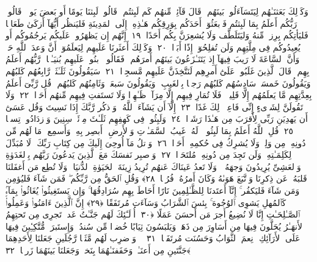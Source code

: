  وَكَذَٟلِكَ بَعَثنَـٰهُم لِيَتَسَآءَلُوا۟ بَينَهُم ۚ قَالَ قَآئِلٌۭ مِّنهُم كَم لَبِثتُم ۖ قَالُوا۟ لَبِثنَا يَومًا أَو بَعضَ يَومٍۢ ۚ قَالُوا۟ رَبُّكُم أَعلَمُ بِمَا لَبِثتُم فَٱبعَثُوٓا۟ أَحَدَكُم بِوَرِقِكُم هَـٰذِهِۦٓ إِلَى ٱلمَدِينَةِ فَليَنظُر أَيُّهَآ أَزكَىٰ طَعَامًۭا فَليَأتِكُم بِرِزقٍۢ مِّنهُ وَليَتَلَطَّف وَلَا يُشعِرَنَّ بِكُم أَحَدًا ﴿١٩﴾
 إِنَّهُم إِن يَظهَرُوا۟ عَلَيكُم يَرجُمُوكُم أَو يُعِيدُوكُم فِى مِلَّتِهِم وَلَن تُفلِحُوٓا۟ إِذًا أَبَدًۭا ﴿٢٠﴾
 وَكَذَٟلِكَ أَعثَرنَا عَلَيهِم لِيَعلَمُوٓا۟ أَنَّ وَعدَ ٱللَّهِ حَقٌّۭ وَأَنَّ ٱلسَّاعَةَ لَا رَيبَ فِيهَآ إِذ يَتَنَـٰزَعُونَ بَينَهُم أَمرَهُم ۖ فَقَالُوا۟ ٱبنُوا۟ عَلَيهِم بُنيَـٰنًۭا ۖ رَّبُّهُم أَعلَمُ بِهِم ۚ قَالَ ٱلَّذِينَ غَلَبُوا۟ عَلَىٰٓ أَمرِهِم لَنَتَّخِذَنَّ عَلَيهِم مَّسجِدًۭا ﴿٢١﴾
 سَيَقُولُونَ ثَلَـٰثَةٌۭ رَّابِعُهُم كَلبُهُم وَيَقُولُونَ خَمسَةٌۭ سَادِسُهُم كَلبُهُم رَجمًۢا بِٱلغَيبِ ۖ وَيَقُولُونَ سَبعَةٌۭ وَثَامِنُهُم كَلبُهُم ۚ قُل رَّبِّىٓ أَعلَمُ بِعِدَّتِهِم مَّا يَعلَمُهُم إِلَّا قَلِيلٌۭ ۗ فَلَا تُمَارِ فِيهِم إِلَّا مِرَآءًۭ ظَـٰهِرًۭا وَلَا تَستَفتِ فِيهِم مِّنهُم أَحَدًۭا ﴿٢٢﴾
 وَلَا تَقُولَنَّ لِشَا۟ىءٍ إِنِّى فَاعِلٌۭ ذَٟلِكَ غَدًا ﴿٢٣﴾
 إِلَّآ أَن يَشَآءَ ٱللَّهُ ۚ وَٱذكُر رَّبَّكَ إِذَا نَسِيتَ وَقُل عَسَىٰٓ أَن يَهدِيَنِ رَبِّى لِأَقرَبَ مِن هَـٰذَا رَشَدًۭا ﴿٢٤﴾
 وَلَبِثُوا۟ فِى كَهفِهِم ثَلَـٰثَ مِا۟ئَةٍۢ سِنِينَ وَٱزدَادُوا۟ تِسعًۭا ﴿٢٥﴾
 قُلِ ٱللَّهُ أَعلَمُ بِمَا لَبِثُوا۟ ۖ لَهُۥ غَيبُ ٱلسَّمَـٰوَٟتِ وَٱلأَرضِ ۖ أَبصِر بِهِۦ وَأَسمِع ۚ مَا لَهُم مِّن دُونِهِۦ مِن وَلِىٍّۢ وَلَا يُشرِكُ فِى حُكمِهِۦٓ أَحَدًۭا ﴿٢٦﴾
 وَٱتلُ مَآ أُوحِىَ إِلَيكَ مِن كِتَابِ رَبِّكَ ۖ لَا مُبَدِّلَ لِكَلِمَـٰتِهِۦ وَلَن تَجِدَ مِن دُونِهِۦ مُلتَحَدًۭا ﴿٢٧﴾
 وَٱصبِر نَفسَكَ مَعَ ٱلَّذِينَ يَدعُونَ رَبَّهُم بِٱلغَدَوٰةِ وَٱلعَشِىِّ يُرِيدُونَ وَجهَهُۥ ۖ وَلَا تَعدُ عَينَاكَ عَنهُم تُرِيدُ زِينَةَ ٱلحَيَوٰةِ ٱلدُّنيَا ۖ وَلَا تُطِع مَن أَغفَلنَا قَلبَهُۥ عَن ذِكرِنَا وَٱتَّبَعَ هَوَىٰهُ وَكَانَ أَمرُهُۥ فُرُطًۭا ﴿٢٨﴾
 وَقُلِ ٱلحَقُّ مِن رَّبِّكُم ۖ فَمَن شَآءَ فَليُؤمِن وَمَن شَآءَ فَليَكفُر ۚ إِنَّآ أَعتَدنَا لِلظَّـٰلِمِينَ نَارًا أَحَاطَ بِهِم سُرَادِقُهَا ۚ وَإِن يَستَغِيثُوا۟ يُغَاثُوا۟ بِمَآءٍۢ كَٱلمُهلِ يَشوِى ٱلوُجُوهَ ۚ بِئسَ ٱلشَّرَابُ وَسَآءَت مُرتَفَقًا ﴿٢٩﴾
 إِنَّ ٱلَّذِينَ ءَامَنُوا۟ وَعَمِلُوا۟ ٱلصَّـٰلِحَـٰتِ إِنَّا لَا نُضِيعُ أَجرَ مَن أَحسَنَ عَمَلًا ﴿٣٠﴾
 أُو۟لَـٰٓئِكَ لَهُم جَنَّـٰتُ عَدنٍۢ تَجرِى مِن تَحتِهِمُ ٱلأَنهَـٰرُ يُحَلَّونَ فِيهَا مِن أَسَاوِرَ مِن ذَهَبٍۢ وَيَلبَسُونَ ثِيَابًا خُضرًۭا مِّن سُندُسٍۢ وَإِستَبرَقٍۢ مُّتَّكِـِٔينَ فِيهَا عَلَى ٱلأَرَآئِكِ ۚ نِعمَ ٱلثَّوَابُ وَحَسُنَت مُرتَفَقًۭا ﴿٣١﴾
 ۞ وَٱضرِب لَهُم مَّثَلًۭا رَّجُلَينِ جَعَلنَا لِأَحَدِهِمَا جَنَّتَينِ مِن أَعنَـٰبٍۢ وَحَفَفنَـٰهُمَا بِنَخلٍۢ وَجَعَلنَا بَينَهُمَا زَرعًۭا ﴿٣٢﴾
